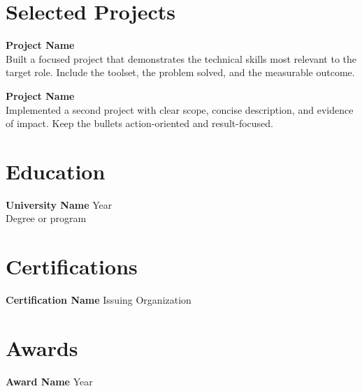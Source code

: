 \documentclass[11pt]{article}
\begin{document}
\section*{Selected Projects}
\textbf{Project Name} \\
Built a focused project that demonstrates the technical skills most relevant to the target role. Include the toolset, the problem solved, and the measurable outcome.

\textbf{Project Name} \\
Implemented a second project with clear scope, concise description, and evidence of impact. Keep the bullets action-oriented and result-focused.

\section*{Education}
\textbf{University Name} \hfill Year \\
Degree or program

\section*{Certifications}
\textbf{Certification Name} \hfill Issuing Organization

\section*{Awards}
\textbf{Award Name} \hfill Year
\end{document}
